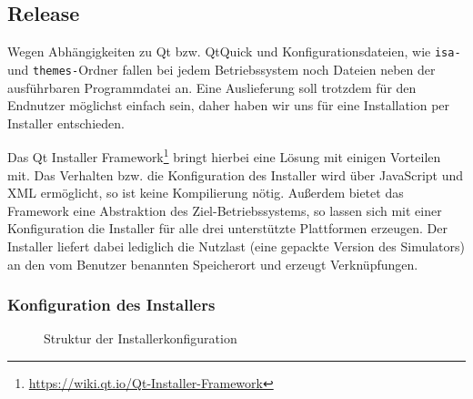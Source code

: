 \subsection{Release}

Wegen Abhängigkeiten zu Qt bzw. QtQuick und Konfigurationsdateien, wie
\texttt{isa-} und \texttt{themes-}Ordner fallen bei jedem Betriebssystem noch
Dateien neben der ausführbaren Programmdatei an. Eine Auslieferung soll trotzdem
für den Endnutzer möglichst einfach sein, daher haben wir uns für eine
Installation per Installer entschieden.

Das Qt Installer
Framework\footnote{\url{https://wiki.qt.io/Qt-Installer-Framework}} bringt
hierbei eine Lösung mit einigen Vorteilen mit. Das Verhalten bzw. die
Konfiguration des Installer wird über JavaScript und XML ermöglicht, so ist
keine Kompilierung nötig. Außerdem bietet das Framework eine Abstraktion des
Ziel-Betriebssystems, so lassen sich mit einer Konfiguration die Installer für
alle drei unterstützte Plattformen erzeugen. Der Installer liefert dabei
lediglich die Nutzlast (eine gepackte Version des Simulators) an den vom
Benutzer benannten Speicherort und erzeugt Verknüpfungen.

\subsubsection{Konfiguration des Installers}
\begin{figure}[H]
	\begin{center}
	\end{center}
	\caption{Struktur der Installerkonfiguration}
	\label{dev-manual-installer}
  \vspace{-0.4cm}
\end{figure}

